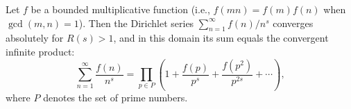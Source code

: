 Let $f$ be a bounded multiplicative function (i.e., $f(mn) = f(m)f(n)$ when $\gcd(m,n)=1$). Then the Dirichlet series $\sum_{n=1}^\infty f(n)/n^s$ converges absolutely for $R(s) > 1$, and in this domain its sum equals the convergent infinite product:
$$
\sum_{n=1}^\infty \frac{f(n)}{n^s} = \prod_{p \in P} \left(1 + \frac{f(p)}{p^s} + \frac{f(p^2)}{p^{2s}} + \cdots\right),
$$
where $P$ denotes the set of prime numbers.

